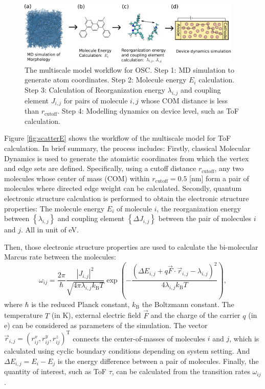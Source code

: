 \documentclass[letterpaper,12pt]{article}
\begin{document}
\begin{figure}[h]
    \centering
    \includegraphics[width=0.95\textwidth]{figs/MSM.png}
    \caption{The multiscale model workflow for OSC. Step 1: MD simulation to generate atom coordinates. Step 2: Molecule energy $E_i$ calculation. Step 3: Calculation of Reorganization energy $\lambda_{i,j}$ and coupling element $J_{i,j}$ for pairs of molecule $i,j$ whose COM distance is less than $r_\text{cutoff}$. Step 4: Modelling dynamics on device level, such as ToF calculation.}
    \label{fig:MSM}
\end{figure}

Figure \ref{fig:scatterE} shows the workflow of the multiscale model for ToF calculation. In brief summary, the process includes: Firstly, classical Molecular Dynamics is used to generate the atomistic coordinates from which the vertex and edge sets are defined.
Specifically, using a cutoff distance $r_\text{cutoff}$, any two molecules whose center of mass (COM) within $r_\text{cutoff}=0.5$ [nm] form a pair of molecules where directed edge weight can be calculated.
Secondly, quantum electronic structure calculation is performed to obtain the electronic structure properties: The molecule energy $E_i$ of molecule $i$, the reorganization energy between $\left\{\lambda_{i,j}\right\}$ and coupling element $\left\{\Delta J_{i,j}\right\}$ between the pair of molecules $i$ and $j$. All in unit of eV. 

Then, those electronic structure properties are used to calculate the bi-molecular Marcus rate between the molecules:
%
\begin{equation}
    \omega_{ij} = \frac{2\pi}{\hbar} \frac{|J_{i,j}|^2}{\sqrt{4\pi \lambda_{i,j} k_\text{B}T}} \exp\left(-\frac{(\Delta E_{i,j} + q \vec{F} \cdot \vec{r}_{i,j} - \lambda_{i,j})^2}{4\lambda_{i,j} k_\text{B}T}\right) ,
    \label{equ:Marcus}
\end{equation}
%
where $\hbar$ is the reduced Planck constant, $k_\text{B}$ the Boltzmann constant. The temperature $T$ (in \unit[]{K}), external electric field $\vec{F}$ and the charge of the carrier $q$ (in \unit[]{e}) can be considered as parameters of the simulation. The vector $\vec{r}_{i,j} = (r^x_{ij},r^y_{ij},r^z_{ij})^\text{T}$ connects the center-of-masses of molecules $i$ and $j$, which is calculated using cyclic boundary conditions depending on system setting. And $\Delta E_{i,j} = E_i - E_j$ is the energy difference between a pair of molecules.
Finally, the quantity of interest, such as ToF $\tau$, can be calculated from the transition rates $\omega_{ij}$.
\end{document}
